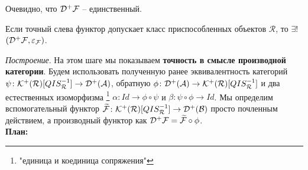 \documentclass[../main.tex]{subfiles}
\begin{document}
\begin{to_com}
Очевидно, что $\mathcal{D^+ \mathcal{F}}$ -- единственный.
\end{to_com}
\begin{to_thr}
Если точный слева функтор допускает класс приспособленных объектов $\mathcal{R}$, то $\exists !$ $(\mathcal{D^+ \mathcal{F}}, \varepsilon_{\mathcal{F}})$.
\end{to_thr}
\textit{Построение}. На этом шаге мы показываем \textbf{точность в смысле производной категории}.
     Будем использовать полученную ранее эквивалентность категорий $\psi\colon \mathcal{K^+(\mathcal{R})}[QIS_{\mathcal{R}}^{-1}]\to \mathcal{D^+(\mathcal{A})}$, обратную $\phi \colon \mathcal{D^+(\mathcal{A})} \to \mathcal{K^+(\mathcal{R})}[QIS_{\mathcal{R}}^{-1}]$ и два естественных изоморфизма \footnote{"единица и коединица сопряжения"} $\alpha\colon Id \to \phi \circ \psi$ и $\beta \colon \psi \circ \phi \to Id$. Мы определим вспомогательный функтор  $\widetilde{\mathcal{F}}\colon \mathcal{K^+(\mathcal{R})}[QIS_{\mathcal{R}}^{-1}]\to \mathcal{D^+(\mathcal{B})}$ просто почленным действием, а производный функтор как $\mathcal{D^+ \mathcal{F}} = \widetilde{\mathcal{F}} \circ \phi$.
     \\
\textbf{План:}
\end{document}
